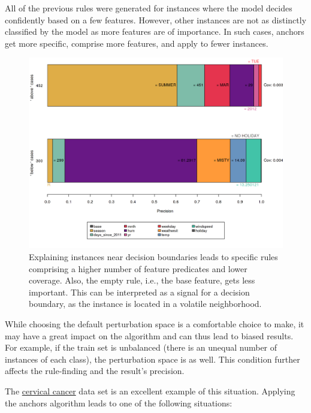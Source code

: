 \documentclass[12pt,]{krantz}
\begin{document}
All of the previous rules were generated for instances where the model
decides confidently based on a few features. However, other instances
are not as distinctly classified by the model as more features are of
importance. In such cases, anchors get more specific, comprise more
features, and apply to fewer instances.

\begin{figure}

{\centering \includegraphics[width=\textwidth]{images/unnamed-chunk-34-1} 

}

\caption{Explaining instances near decision boundaries leads to specific rules comprising a higher number of feature predicates and lower coverage. Also, the empty rule, i.e., the base feature, gets less important. This can be interpreted as a signal for a decision boundary, as the instance is located in a volatile neighborhood.}\label{fig:unnamed-chunk-34}
\end{figure}

While choosing the default perturbation space is a comfortable choice to
make, it may have a great impact on the algorithm and can thus lead to
biased results. For example, if the train set is unbalanced (there is an
unequal number of instances of each class), the perturbation space is as
well. This condition further affects the rule-finding and the result's
precision.

The \protect\hyperlink{cervical}{cervical cancer} data set is an
excellent example of this situation. Applying the anchors algorithm
leads to one of the following situations:
\end{document}
